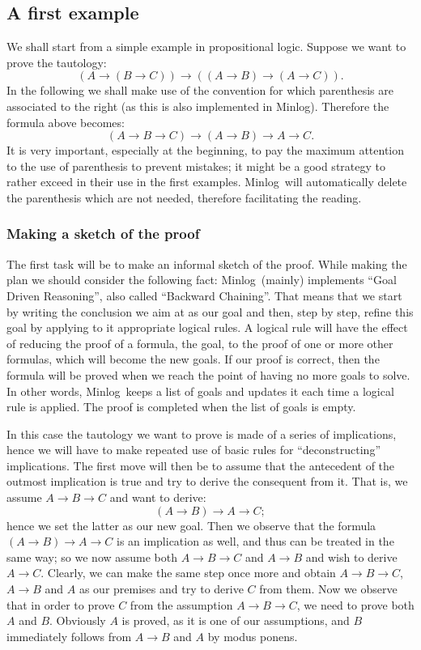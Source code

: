 \documentclass[12pt]{amsart}
\newcommand{\inquotes}[1]{``#1''}
\newcommand{\mi}{Minlog}
\newcommand{\ob}{\to}
\begin{document}
\subsection{A first example}
We shall start from a simple example in propositional logic.  Suppose
we want to prove the tautology:
\begin{equation*}
  (A \ob (B \ob C)) \ob ((A \ob B) \ob (A \ob C)).
\end{equation*}
In the following we shall make use of the convention for which
parenthesis are associated to the right (as this is also implemented
in \mi).  Therefore the formula above becomes:
\begin{equation*}
  (A \ob B \ob C) \ob (A \ob B) \ob A \ob C.
\end{equation*}
It is very important, especially at the beginning, to pay the maximum
attention to the use of parenthesis to prevent mistakes; it might be a
good strategy to rather exceed in their use in the first examples.
\mi\ will automatically delete the parenthesis which are not needed,
therefore facilitating the reading.


\subsubsection{Making a sketch of the proof}
The first task will be to make an informal sketch of the proof.  While
making the plan we should consider the following fact: \mi\ (mainly)
implements \inquotes
{Goal Driven Reasoning}, also called
\inquotes{Backward Chaining}.  That means that we start by writing the
conclusion we aim at as our goal and then, step by step, refine this
goal by applying to it appropriate logical rules.  A logical rule will
have the effect of reducing the proof of a formula, the goal, to the
proof of one or more other formulas, which will become the new goals.
If our proof is correct, then the formula will be proved when we reach
the point of having no more goals to solve.  In other words, \mi\
keeps a list of goals and updates it each time a logical rule is
applied.  The proof is completed when the list of goals is empty.

In this case the tautology we want to prove is made of a series of
implications, hence we will have to make repeated use of basic rules
for \inquotes{deconstructing} implications.  The first move will then
be to assume that the antecedent of the outmost implication is true
and try to derive the consequent from it.  That is, we assume $A \ob B
\ob C$ and want to derive:
\begin{equation*}
  (A \ob B) \ob A \ob C;
\end{equation*}
hence we set the latter as our new goal.  Then we observe that the
formula $(A \ob B) \ob A \ob C$ is an implication as well, and thus
can be treated in the same way; so we now assume both $A \ob B \ob C$
and $A \ob B$ and wish to derive $A \ob C$.  Clearly, we can make the
same step once more and obtain $A \ob B \ob C$, $A \ob B$ and $A$ as
our premises and try to derive $C$ from them.  Now we observe that in
order to prove $C$ from the assumption $A \ob B \ob C$, we need to
prove both $A$ and $B$.  Obviously $A$ is proved, as it is one of our
assumptions, and $B$ immediately follows from $A \ob B$ and $A$ by
modus ponens.
\end{document}
